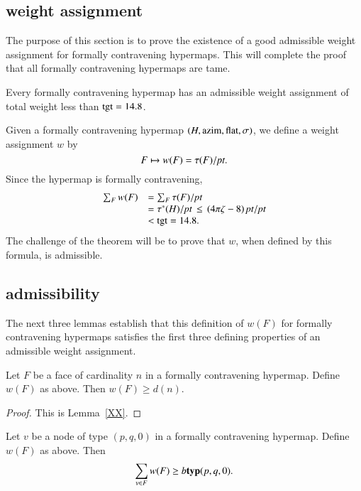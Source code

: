 \subsection{weight assignment}
    \label{sec:weight}

The purpose of this section is to prove the existence of a good
admissible weight assignment for formally contravening hypermaps.
This will complete the proof that all formally contravening
hypermaps are tame.

\begin{theorem}  Every formally contravening hypermap has an admissible
weight assignment of total weight less than ${\operatorname{tgt}}=14.8$.
\end{theorem}

Given a formally contravening hypermap $(H,{\operatorname{azim}},\operatorname{flat},\sigma)$, we
define a weight assignment $w$ by
    $$F \mapsto w(F) = \tau(F)/\hbox{\it pt}.$$
Since the hypermap is formally contravening,
    $$
    \begin{array}{lll}
    \sum_F w(F) &= \sum_F \tau(F)/\hbox{\it pt} \\
            &= \tau^*(H)/\hbox{\it pt}\,\le\,(4\pi\zeta-8)\,\hbox{\it pt}/\hbox{\it pt} \\
        &< {\operatorname{tgt}}=14.8.
    \end{array}
    $$
The challenge of the theorem will be to prove that $w$, when
defined by this formula, is admissible.

\subsection{admissibility}
\label{sec:admissibility}

The next three lemmas establish that this definition of $w(F)$ for
formally contravening hypermaps satisfies the first three defining
properties of an admissible weight assignment.

\begin{lemma}  Let $F$ be a face of cardinality $n$ in a formally contravening hypermap.
Define $w(F)$ as above. Then
        $w(F) \ge d(n)$.
\end{lemma}

\begin{proof} This is Lemma~\ref{XX}. %
\end{proof}

\begin{lemma} Let $v$ be a node of type $(p,q,0)$ in a
formally contravening hypermap.  Define $w(F)$ as above. Then
        $$\sum_{v\in F} w(F) \ge b{{\operatorname{\bf typ}}{(p,q,0)}}.$$
\end{lemma}


